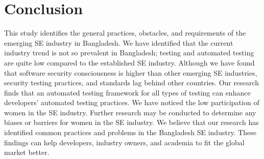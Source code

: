 \section{Conclusion}
\label{conclusion}

This study identifies the general practices, obstacles, and requirements of the emerging SE industry in Bangladesh. We have identified that the current industry trend is not so prevalent in Bangladesh; testing and automated testing are quite low compared to the established SE industry. Although we have found that software security consciousness is higher than other emerging SE industries, security testing practices, and standards lag behind other countries. Our research finds that an automated testing framework for all types of testing can enhance developers' automated testing practices. We have noticed the low participation of women in the SE industry. Further research may be conducted to determine any biases or barriers for women in the SE industry. We believe that our research has identified common practices and problems in the Bangladesh SE industry. These findings can help developers, industry owners, and academia to fit the global market better.